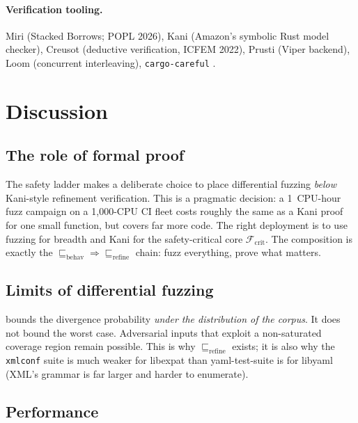 \documentclass[12pt]{article}
\theoremstyle{definition}
\theoremstyle{remark}
\begin{document}
\paragraph{Verification tooling.} Miri \cite{jung2026miri} (Stacked
Borrows; POPL 2026), Kani (Amazon's symbolic Rust model checker),
Creusot \cite{denis2022creusot} (deductive verification, ICFEM 2022),
Prusti (Viper backend), Loom (concurrent interleaving),
\texttt{cargo-careful} \cite{ralfj2023careful}.

\section{Discussion}
\label{sec:discussion}

\subsection{The role of formal proof}

The safety ladder makes a deliberate choice to place differential
fuzzing \emph{below} Kani-style refinement verification. This is a
pragmatic decision: a 1~CPU-hour fuzz campaign on a 1{,}000-CPU CI
fleet costs roughly the same as a Kani proof for one small function,
but covers far more code. The right deployment is to use fuzzing for
breadth and Kani for the safety-critical core
$\mathcal{F}_{\mathrm{crit}}$. The composition is exactly the
$\sqsubseteq_{\mathrm{behav}} \Rightarrow \sqsubseteq_{\mathrm{refine}}$
chain: fuzz everything, prove what matters.

\subsection{Limits of differential fuzzing}

 bounds the divergence probability \emph{under the
distribution of the corpus}. It does not bound the worst case.
Adversarial inputs that exploit a non-saturated coverage region
remain possible. This is why $\sqsubseteq_{\mathrm{refine}}$ exists;
it is also why the \texttt{xmlconf} suite is much weaker for libexpat
than yaml-test-suite is for libyaml (XML's grammar is far larger and
harder to enumerate).

\subsection{Performance}
\end{document}
